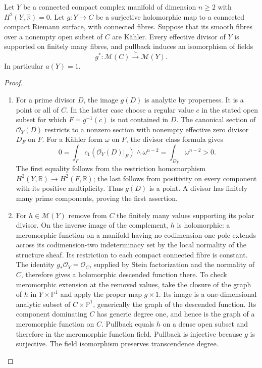 \begin{proposition}\hypertarget{tag-01GG}{}\label{cdp:st:E1}

Let $Y$ be a connected compact complex manifold of dimension $n\geq2$
with $H^2(Y,\mathbb R)=0$. Let $g:Y\to C$ be a surjective holomorphic
map to a connected compact Riemann surface, with connected fibres.
Suppose that its smooth fibres over a nonempty open subset of $C$ are
K\"ahler. Every effective divisor of $Y$ is supported on finitely many
fibres, and pullback induces an isomorphism of fields
\[
 g^*: \mathcal M(C)\xrightarrow{\ \sim\ }\mathcal M(Y).
\]
In particular $a(Y)=1$. 
\end{proposition}


\begin{proof}

\begin{enumerate}[label={$\langle1\rangle$\arabic*.},leftmargin=*]
\item For a prime divisor $D$, the image $g(D)$ is analytic by properness. It
is a point or all of $C$. In the latter case choose a regular value $c$
in the stated open subset for which $F=g^{-1}(c)$ is not contained in
$D$. The canonical section of $\mathcal O_Y(D)$ restricts to a nonzero
section with nonempty effective zero divisor $D_F$ on $F$. For a
K\"ahler form $\omega$ on $F$, the divisor class formula gives
\[
 0=\int_F c_1(\mathcal O_Y(D)|_F)\wedge\omega^{n-2}
   =\int_{D_F}\omega^{n-2}>0.
\]
The first equality follows from the restriction homomorphism
$H^2(Y,\mathbb R)\to H^2(F,\mathbb R)$; the last follows from positivity
on every component with its positive multiplicity. Thus $g(D)$ is a
point. A divisor has finitely many prime components, proving the first
assertion.

\item For $h\in\mathcal M(Y)$ remove from $C$ the finitely many values
supporting its polar divisor. On the inverse image of the complement,
$h$ is holomorphic: a meromorphic function on a manifold having no
codimension-one pole extends across its codimension-two indeterminacy
set by the local normality of the structure sheaf. Its restriction to
each compact connected fibre is constant. The identity
$g_*\mathcal O_Y=\mathcal O_C$, supplied by Stein factorization and
the normality of $C$, therefore gives a holomorphic descended function
there. To check meromorphic extension at the removed values, take the
closure of the graph of $h$ in $Y\times\mathbb P^1$ and apply the proper
map $g\times1$. Its image is a one-dimensional analytic subset of
$C\times\mathbb P^1$, generically the graph of the descended function.
Its component dominating $C$ has generic degree one, and hence is the
graph of a meromorphic function on $C$. Pullback equals $h$ on a dense
open subset and therefore in the meromorphic function field. Pullback
is injective because $g$ is surjective. The field isomorphism preserves transcendence degree.

\end{enumerate}
\end{proof}